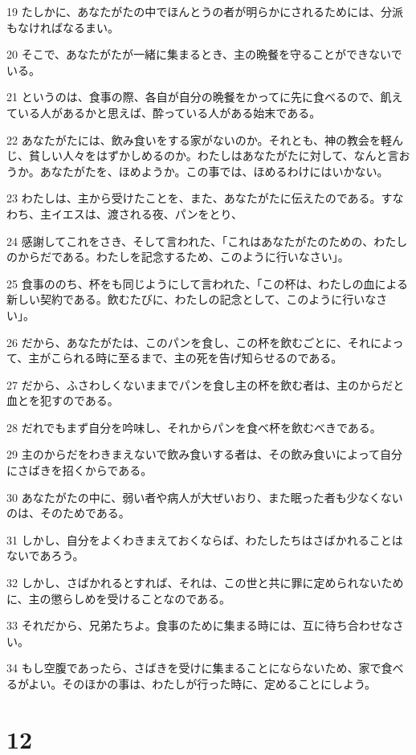 \par 19 たしかに、あなたがたの中でほんとうの者が明らかにされるためには、分派もなければなるまい。
\par 20 そこで、あなたがたが一緒に集まるとき、主の晩餐を守ることができないでいる。
\par 21 というのは、食事の際、各自が自分の晩餐をかってに先に食べるので、飢えている人があるかと思えば、酔っている人がある始末である。
\par 22 あなたがたには、飲み食いをする家がないのか。それとも、神の教会を軽んじ、貧しい人々をはずかしめるのか。わたしはあなたがたに対して、なんと言おうか。あなたがたを、ほめようか。この事では、ほめるわけにはいかない。
\par 23 わたしは、主から受けたことを、また、あなたがたに伝えたのである。すなわち、主イエスは、渡される夜、パンをとり、
\par 24 感謝してこれをさき、そして言われた、「これはあなたがたのための、わたしのからだである。わたしを記念するため、このように行いなさい」。
\par 25 食事ののち、杯をも同じようにして言われた、「この杯は、わたしの血による新しい契約である。飲むたびに、わたしの記念として、このように行いなさい」。
\par 26 だから、あなたがたは、このパンを食し、この杯を飲むごとに、それによって、主がこられる時に至るまで、主の死を告げ知らせるのである。
\par 27 だから、ふさわしくないままでパンを食し主の杯を飲む者は、主のからだと血とを犯すのである。
\par 28 だれでもまず自分を吟味し、それからパンを食べ杯を飲むべきである。
\par 29 主のからだをわきまえないで飲み食いする者は、その飲み食いによって自分にさばきを招くからである。
\par 30 あなたがたの中に、弱い者や病人が大ぜいおり、また眠った者も少なくないのは、そのためである。
\par 31 しかし、自分をよくわきまえておくならば、わたしたちはさばかれることはないであろう。
\par 32 しかし、さばかれるとすれば、それは、この世と共に罪に定められないために、主の懲らしめを受けることなのである。
\par 33 それだから、兄弟たちよ。食事のために集まる時には、互に待ち合わせなさい。
\par 34 もし空腹であったら、さばきを受けに集まることにならないため、家で食べるがよい。そのほかの事は、わたしが行った時に、定めることにしよう。

\chapter{12}

